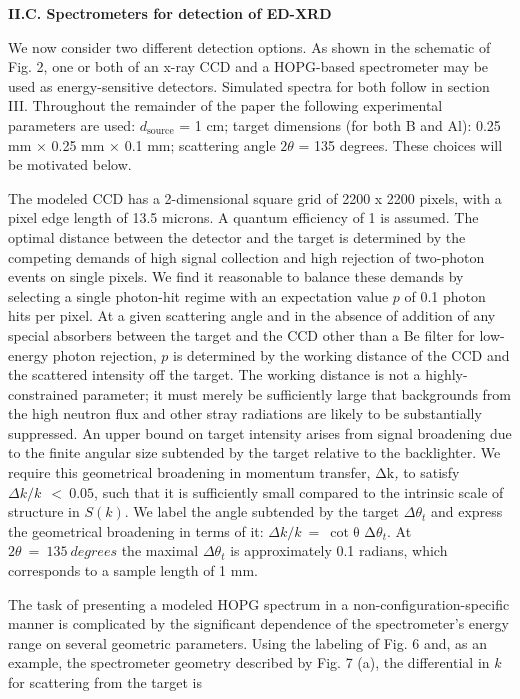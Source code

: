 \textbf{II.C. Spectrometers for detection of ED-XRD}

We now consider two different detection options. As shown in the
schematic of Fig. 2, one or both of an x-ray CCD and a HOPG-based
spectrometer may be used as energy-sensitive detectors. Simulated
spectra for both follow in section III. Throughout the remainder of the
paper the following experimental parameters are used:
\(d_{\text{source}}\) = 1 cm; target dimensions (for both B and Al):
0.25 mm × 0.25 mm × 0.1 mm; scattering angle \(2\theta\) = 135 degrees.
These choices will be motivated below.

The modeled CCD has a 2-dimensional square grid of 2200 x 2200 pixels,
with a pixel edge length of 13.5 microns. A quantum efficiency of 1 is
assumed. The optimal distance between the detector and the target is
determined by the competing demands of high signal collection and high
rejection of two-photon events on single pixels. We find it reasonable
to balance these demands by selecting a single photon-hit regime with an
expectation value \(p\) of 0.1 photon hits per pixel. At a given
scattering angle and in the absence of addition of any special absorbers
between the target and the CCD other than a Be filter for low-energy
photon rejection, \(p\) is determined by the working distance of the CCD
and the scattered intensity off the target. The working distance is not
a highly-constrained parameter; it must merely be sufficiently large
that backgrounds from the high neutron flux and other stray radiations
are likely to be substantially suppressed. An upper bound on target
intensity arises from signal broadening due to the finite angular size
subtended by the target relative to the backlighter. We require this
geometrical broadening in momentum transfer, \(\text{Δk}\)\emph{,} to
satisfy \(\Delta k/k\ \  < \ 0.05\), such that it is sufficiently small
compared to the intrinsic scale of structure in \(S(k)\). We label the
angle subtended by the target \(\Delta\theta_{t}\) and express the
geometrical broadening in terms of it:
\(\Delta k/k\  = \ \cot{\text{θ\ Δ}\theta_{t}}.\) At
\(2\theta\  = \ 135\ degrees\) the maximal \(\Delta\theta_{t}\) is
approximately 0.1 radians, which corresponds to a sample length of 1 mm.

The task of presenting a modeled HOPG spectrum in a
non-configuration-specific manner is complicated by the significant
dependence of the spectrometer's energy range on several geometric
parameters. Using the labeling of Fig. 6 and, as an example, the
spectrometer geometry described by Fig. 7 (a), the differential in \(k\)
for scattering from the target is

